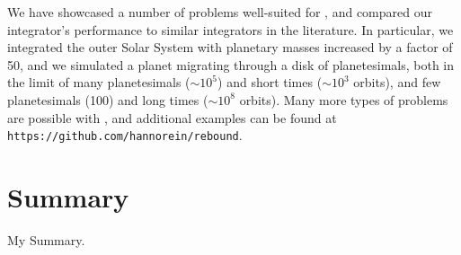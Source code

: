 We have showcased a number of problems well-suited for \hermes, and compared our integrator's performance to similar integrators in the literature. 
In particular, we integrated the outer Solar System with planetary masses increased by a factor of 50, and we simulated a planet migrating through a disk of planetesimals, both in the limit of many planetesimals ($\sim 10^5$) and short times ($\sim 10^3$ orbits), and few planetesimals (100) and long times ($\sim 10^8$ orbits).
Many more types of problems are possible with \hermes, and additional examples can be found at {\sc \tt https://github.com/hannorein/rebound}.

\section{Summary }

My Summary.